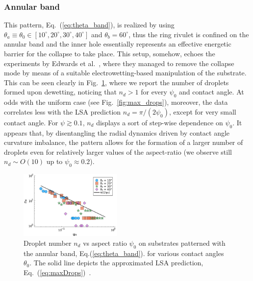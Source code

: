 \documentclass[twoside,twocolumn,9pt]{article}
\begin{document}
\subsubsection{Annular band}\label{subsubsec:banded}
This pattern, Eq.~(\ref{eq:theta_band}), is realized by using $\theta_a \equiv \theta_0 \in [10^{\circ}, 20^{\circ}, 30^{\circ}, 40^{\circ}]$ and $\theta_b = 60^{\circ}$, thus
the ring rivulet is confined on the annular band and the inner hole 
essentially represents an effective energetic barrier for the collapse to take place.
This setup, somehow, echoes the experiments by 
Edwards et al.~\cite{edwardsControllingBreakupToroidal2021}, where they managed to remove the collapse mode by means of a suitable electrowetting-based manipulation of the substrate.
This can be seen clearly in Fig.~\ref{fig:max_drops_band}, where we report the number of droplets formed upon 
dewetting, noticing that $n_d>1$ for every $\psi_0$ and contact angle. At odds with the uniform case 
(see Fig.~\ref{fig:max_drops}), moreover, the data correlates less with the LSA prediction $n_d = \pi/(2\psi_0)$, except for very small contact angle. For $\psi \gtrsim 0.1$, $n_d$ displays a sort of step-wise dependence on
$\psi_0$. It appears that, by disentangling the radial dynamics driven by contact angle curvature imbalance, the pattern allows for the formation of a larger number of droplets even for relatively larger values of the aspect-ratio (we observe still $n_d \sim O(10)$ up to $\psi_0 \approx 0.2$).
\begin{figure}
    \centering
    \includegraphics[width=0.45\textwidth]{assets/Ndrops_ban_new.pdf}    
    \caption{Droplet number $n_d$ vs aspect ratio $\psi_0$ on substrates patterned with 
    the annular band, Eq.(\ref{eq:theta_band}).
    for various contact angles $\theta_0$. The solid line depicts the 
    approximated LSA prediction, Eq.~(\ref{eq:maxDrops})~\cite{gonzalezStabilityLiquidRing2013}.}
    \label{fig:max_drops_band}
\end{figure}
\end{document}
